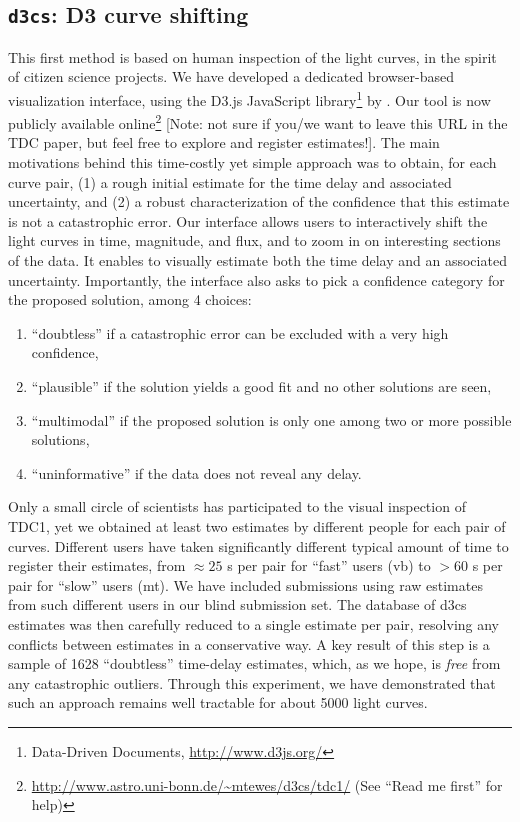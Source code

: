 \documentclass[traditabstract]{aa}
\begin{document}
\subsection{{\tt d3cs}: D3 curve shifting}
This first method is based on human inspection of the light curves, in the spirit of citizen science projects. We have developed a dedicated browser-based visualization interface, using the D3.js JavaScript library\footnote{Data-Driven Documents, \url{http://www.d3js.org/}} by \citet{d3}. Our tool is now publicly available online\footnote{\url{http://www.astro.uni-bonn.de/~mtewes/d3cs/tdc1/} (See ``Read me first'' for help)} [Note: not sure if you/we want to leave this URL in the TDC paper, but feel free to explore and register estimates!]. The main motivations behind this time-costly yet simple approach was to obtain, for each curve pair, (1) a rough initial estimate for the time delay and associated uncertainty, and (2) a robust characterization of the confidence that this estimate is not a catastrophic error. Our interface allows users to interactively shift the light curves in time, magnitude, and flux, and to zoom in on interesting sections of the data. It enables to visually estimate both the time delay and an associated uncertainty. Importantly, the interface also asks to pick a confidence category for the proposed solution, among 4 choices:
\begin{enumerate}
\item ``doubtless'' if a catastrophic error can be excluded with a very high confidence,
\item ``plausible'' if the solution yields a good fit and no other solutions are seen,
\item ``multimodal'' if the proposed solution is only one among two or more possible solutions,
\item ``uninformative'' if the data does not reveal any delay.
\end{enumerate}
Only a small circle of scientists has participated to the visual inspection of TDC1, yet we obtained at least two estimates by different people for each pair of curves. Different users have taken significantly different typical amount of time to register their estimates, from $\approx 25$ s per pair for ``fast'' users (vb) to $> 60$ s per pair for ``slow'' users (mt). We have included submissions using raw estimates from such different users in our blind submission set. The database of d3cs estimates was then carefully reduced to a single estimate per pair, resolving any conflicts between estimates in a conservative way. A key result of this step is a sample of 1628 ``doubtless'' time-delay estimates, which, as we hope, is \emph{free} from any catastrophic outliers. Through this experiment, we have demonstrated that such an approach remains well tractable for about 5000 light curves.
\end{document}
